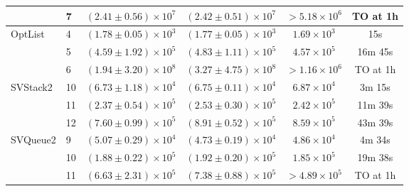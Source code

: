 \documentclass[acmsmall]{acmart}
\begin{document}
\begin{table}[tbp]
\begin{tabular}{llcccc}
 & 7 & $(2.41 \pm 0.56) \times 10^{7}$ & $(2.42 \pm 0.51) \times 10^{7}$ & $>5.18 \times 10^{6}$ & TO at 1h  \\
\midrule
\multirow{3}{*}{OptList} & 4 & $(1.78 \pm 0.05) \times 10^{3}$ & $(1.77 \pm 0.05) \times 10^{3}$ & $1.69 \times 10^{3}$ & 15s \\
 & 5 & $(4.59 \pm 1.92) \times 10^{5}$ & $(4.83 \pm 1.11) \times 10^{5}$ & $4.57 \times 10^{5}$ & 16m 45s \\
 & 6 & $(1.94 \pm 3.20) \times 10^{8}$ & $(3.27 \pm 4.75) \times 10^{8}$ & $>1.16 \times 10^{6}$ & TO at 1h  \\
\midrule
\multirow{3}{*}{SVStack2} & 10 & $(6.73 \pm 1.18) \times 10^{4}$ & $(6.75 \pm 0.11) \times 10^{4}$ & $6.87 \times 10^{4}$ & 3m 15s \\
 & 11 & $(2.37 \pm 0.54) \times 10^{5}$ & $(2.53 \pm 0.30) \times 10^{5}$ & $2.42 \times 10^{5}$ & 11m 39s \\
 & 12 & $(7.60 \pm 0.99) \times 10^{5}$ & $(8.91 \pm 0.52) \times 10^{5}$ & $8.59 \times 10^{5}$ & 43m 39s \\
\midrule
\multirow{3}{*}{SVQueue2} & 9 & $(5.07 \pm 0.29) \times 10^{4}$ & $(4.73 \pm 0.19) \times 10^{4}$ & $4.86 \times 10^{4}$ & 4m 34s \\
 & 10 & $(1.88 \pm 0.22) \times 10^{5}$ & $(1.92 \pm 0.20) \times 10^{5}$ & $1.85 \times 10^{5}$ & 19m 38s \\
 & 11 & $(6.63 \pm 2.31) \times 10^{5}$ & $(7.38 \pm 0.88) \times 10^{5}$ & $>4.89 \times 10^{5}$ & TO at 1h  \\


\end{tabular}
\end{table}
\end{document}
